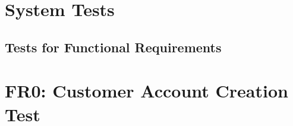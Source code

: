 \documentclass[12pt, titlepage]{article}
\begin{document}

\section{System Tests}


\subsection{Tests for Functional Requirements}

\section*{FR0: Customer Account Creation Test}
\end{document}
